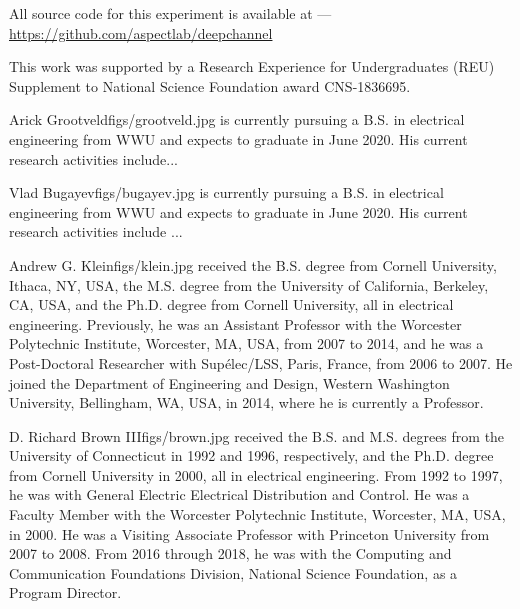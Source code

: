 \documentclass[twocolumn,letterpaper]{IEEEAerospaceCLS}  %
\begin{document}
All source code for this experiment is available at ---\\
\url{https://github.com/aspectlab/deepchannel}




\acknowledgments
This work was supported by a Research Experience for Undergraduates
(REU) Supplement to National Science Foundation award CNS-1836695.


\newpage



\newpage
\thebiography
\begin{biographywithpic}
{Arick Grootveld}{figs/grootveld.jpg}
is currently pursuing a B.S. in electrical engineering from WWU and expects to graduate in June 2020. His current research activities include... 
\lipsum[1-1]
\end{biographywithpic}

\begin{biographywithpic}
{Vlad Bugayev}{figs/bugayev.jpg}
is currently pursuing a B.S. in electrical engineering from WWU and expects to graduate in June 2020. His current research activities include ...
\lipsum[1-1]
\end{biographywithpic}

\begin{biographywithpic}
{Andrew G. Klein}{figs/klein.jpg}
received the B.S. degree from Cornell University, Ithaca,
NY, USA, the M.S. degree from the University of
California, Berkeley, CA, USA, and the Ph.D.
degree from Cornell University, all in electrical
engineering. Previously, he was an Assistant Professor with the Worcester Polytechnic Institute,
Worcester, MA, USA, from 2007 to 2014, and he
was a Post-Doctoral Researcher with Sup\'{e}lec/LSS,
Paris, France, from 2006 to 2007. He joined the
Department of Engineering and Design, Western
Washington University, Bellingham, WA, USA, in 2014, where he is currently
a Professor.
\end{biographywithpic}

\begin{biographywithpic}
{D. Richard Brown III}{figs/brown.jpg}
received the B.S. and M.S. degrees from the University of Connecticut in 1992 and 1996, respectively, and the Ph.D. degree from Cornell University
in 2000, all in electrical engineering. From 1992
to 1997, he was with General Electric Electrical
Distribution and Control. He was a Faculty Member
with the Worcester Polytechnic Institute, Worcester,
MA, USA, in 2000. He was a Visiting Associate
Professor with Princeton University from 2007 to
2008. From 2016 through 2018, he was with the Computing
and Communication Foundations Division, National Science Foundation, as
a Program Director.
\end{biographywithpic}
\end{document}
